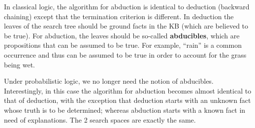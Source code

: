 In classical logic, the algorithm for abduction is identical to deduction (backward chaining) except that the termination criterion is different.  In deduction the leaves of the search tree should be ground facts in the KB (which are believed to be true).  For abduction, the leaves should be so-called \textbf{abducibles}, which are propositions that can be assumed to be true.  For example, ``rain'' is a common occurrence and thus can be assumed to be true in order to account for the grass being wet.

Under probabilistic logic, we no longer need the notion of abducibles.  Interestingly, in this case the algorithm for abduction becomes almost identical to that of deduction, with the exception that deduction starts with an unknown fact whose truth is to be determined; whereas abduction starts with a known fact in need of explanations.  The 2 search spaces are exactly the same.

%
%
